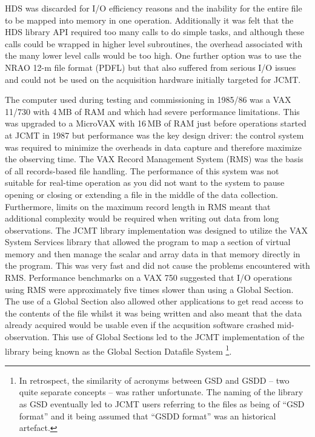 \documentclass[final,authoryear,5p,times,twocolumn]{elsarticle}
\begin{document}
HDS was discarded for I/O efficiency reasons and the inability for the
entire file to be mapped into memory in one operation. Additionally it
was felt that the HDS library API required too many calls to do simple
tasks, and although these calls could be wrapped in higher level
subroutines, the overhead associated with the many lower level calls
would be too high. One further option was to use the NRAO 12-m file format (PDFL)
but that also suffered from serious I/O issues and could not be used
on the acquisition hardware initially targeted for JCMT.

The computer used during testing and commissioning in 1985/86 was a
VAX 11/730 with 4\,MB of RAM and which had severe performance
limitations. This was upgraded to a MicroVAX with 16\,MB of RAM just
before operations started at JCMT in 1987 but performance was the key
design driver: the control system was required to minimize the
overheads in data capture and therefore maximize the observing
time. The VAX Record Management System (RMS) was the basis of all
records-based file handling. The performance of this system was not
suitable for real-time operation as you did not want to the system to
pause opening or closing or extending a file in the middle of the data
collection. Furthermore, limits on the maximum record length in RMS
meant that additional complexity would be required when writing out
data from long observations. The JCMT library implementation was
designed to utilize the VAX System Services library that allowed the
program to map a section of virtual memory and then manage the scalar
and array data in that memory directly in the program. This was very
fast and did not cause the problems encountered with RMS. Performance
benchmarks on a VAX 750 \citep{mtin33} suggested that I/O operations
using RMS were approximately five times slower than using a Global
Section. The use of a Global Section also allowed other applications
to get read access to the contents of the file whilst it was being
written and also meant that the data already acquired would be usable
even if the acqusition software crashed mid-observation. This use of
Global Sections led to the JCMT implementation of the library being
known as the Global Section Datafile System
\citep[GSD;][]{mtin33}\footnote{In retrospect, the similarity of
  acronyms between GSD and GSDD -- two quite separate concepts -- was
  rather unfortunate. The naming of the library as GSD eventually led
  to JCMT users referring to the files as being of ``GSD format'' and
  it being assumed that ``GSDD format'' was an historical artefact.}.
\end{document}
